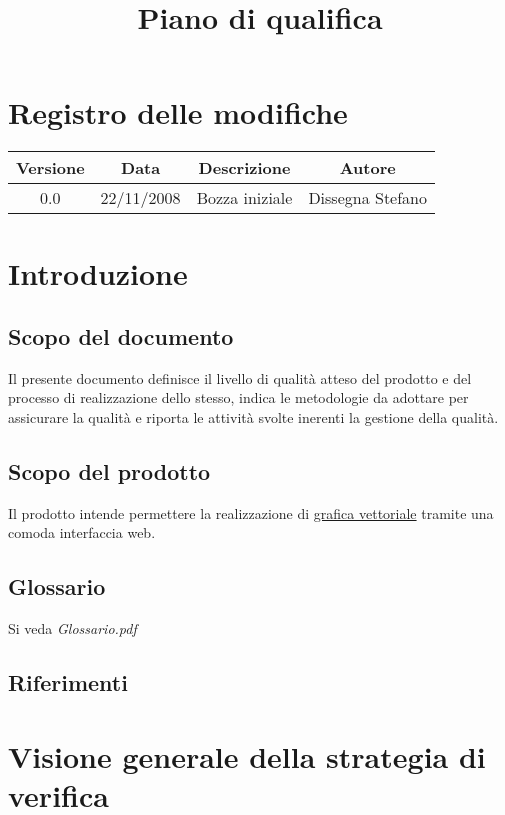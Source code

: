\documentclass[a4paper]{article}
\begin{document}
\title{Piano di qualifica}

\section{Registro delle modifiche}
\begin{tabular}{|c|c|c|c|}
\hline
Versione & Data & Descrizione & Autore \\ \hline 
0.0 & 22/11/2008 & Bozza iniziale & Dissegna Stefano \\ \hline 
\end{tabular} 

\section{Introduzione}

\subsection{Scopo del documento}
Il presente documento definisce il livello di qualit\`a atteso del prodotto e del processo di realizzazione dello stesso, indica le metodologie da adottare per assicurare la qualit\`a e riporta le attivit\`a svolte inerenti la gestione della qualit\`a.

\subsection{Scopo del prodotto}
Il prodotto intende permettere la realizzazione di \underline{grafica vettoriale} tramite una comoda interfaccia web.

\subsection{Glossario}
Si veda \textit{Glossario.pdf}

\subsection{Riferimenti}

\section{Visione generale della strategia di verifica}
\end{document}

